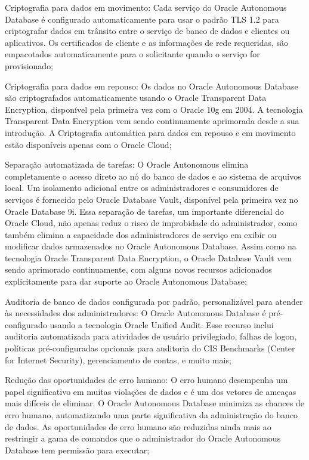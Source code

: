 \begin{alineas} 
\item Criptografia para dados em movimento:  Cada serviço do Oracle Autonomous Database é configurado automaticamente para usar o padrão TLS 1.2 para criptografar dados em trânsito entre o serviço de banco de dados e clientes ou aplicativos. Os certificados de cliente e as informações de rede requeridas, são empacotados automaticamente para o solicitante quando o serviço for provisionado;

\item Criptografia para dados em repouso: Os dados no Oracle Autonomous Database são criptografados automaticamente usando o Oracle Transparent Data Encryption, disponível pela primeira vez com o Oracle 10g em 2004. A tecnologia Transparent Data Encryption vem sendo continuamente aprimorada desde a sua introdução. A Criptografia automática para dados em repouso e em movimento estão disponíveis apenas com o Oracle Cloud;

\item Separação automatizada de tarefas: O Oracle Autonomous elimina completamente o acesso direto ao nó do banco de dados e ao sistema de arquivos local. Um isolamento adicional entre os administradores e consumidores de serviços é fornecido pelo Oracle Database Vault, disponível pela primeira vez no Oracle Database 9i. Essa separação de tarefas, um importante diferencial do Oracle Cloud, não apenas reduz o risco de improbidade do administrador, como também elimina a capacidade dos administradores de serviço em exibir ou modificar dados armazenados no Oracle Autonomous Database. Assim como na tecnologia Oracle Transparent Data Encryption, o Oracle Database Vault vem sendo  aprimorado continuamente, com alguns novos recursos adicionados explicitamente para dar suporte ao Oracle Autonomous Database;

\item Auditoria de banco de dados configurada por padrão, personalizável para atender às necessidades dos administradores: O Oracle Autonomous Database é pré-configurado usando a tecnologia Oracle Unified Audit. Esse recurso inclui auditoria automatizada para atividades de usuário privilegiado, falhas de logon, políticas pré-configuradas opcionais para auditoria do CIS Benchmarks (Center for Internet Security), gerenciamento de contas, e muito mais;

\item Redução das oportunidades de erro humano: O erro humano desempenha um papel significativo em muitas violações de dados e é um dos vetores de ameaças mais difíceis de eliminar. O Oracle Autonomous Database minimiza as chances de erro humano, automatizando uma parte significativa da administração do banco de dados. As oportunidades de erro humano são reduzidas ainda mais ao restringir a gama de comandos que o administrador do Oracle Autonomous Database tem permissão para executar;


\end{alineas}
